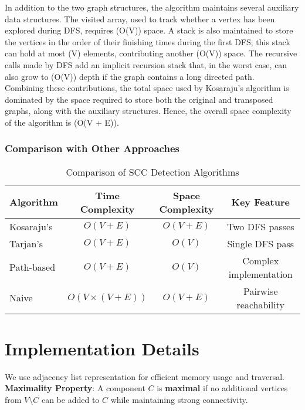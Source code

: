 \documentclass{book}
\theoremstyle{definition}
\begin{document}
In addition to the two graph structures, the algorithm maintains several auxiliary data structures. The visited array, used to track whether a vertex has been explored during DFS, requires (O(V)) space. A stack is also maintained to store the vertices in the order of their finishing times during the first DFS; this stack can hold at most (V) elements, contributing another (O(V)) space. The recursive calls made by DFS add an implicit recursion stack that, in the worst case, can also grow to (O(V)) depth if the graph contains a long directed path.\\

Combining these contributions, the total space used by Kosaraju’s algorithm is dominated by the space required to store both the original and transposed graphs, along with the auxiliary structures. Hence, the overall space complexity of the algorithm is (O(V + E)).



\subsection{Comparison with Other Approaches}

\begin{table}[h]
\centering
\begin{tabular}{lccc}
\toprule
\textbf{Algorithm} & \textbf{Time Complexity} & \textbf{Space Complexity} & \textbf{Key Feature} \\
\midrule
Kosaraju's & $O(V + E)$ & $O(V + E)$ & Two DFS passes \\
Tarjan's & $O(V + E)$ & $O(V)$ & Single DFS pass \\
Path-based & $O(V + E)$ & $O(V)$ & Complex implementation \\
Naive & $O(V \times (V + E))$ & $O(V + E)$ & Pairwise reachability \\
\bottomrule
\end{tabular}
\caption{Comparison of SCC Detection Algorithms}
\end{table}

\chapter{Implementation Details}

We use adjacency list representation for efficient memory usage and traversal.\\
\textbf{Maximality Property}: A component $C$ is \textbf{maximal} if no additional vertices from $V \setminus C$ can be added to $C$ while maintaining strong connectivity.
\end{document}

